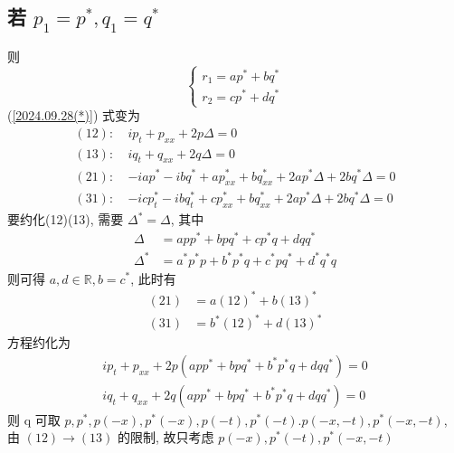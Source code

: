 \subsection{若 $ p_{1} = p^{*}, q_{1} = q^{*}$}
则
\begin{equation}
    \begin{cases}\label{2024.09.28r}
        r_1 = ap^{*} + bq^{*} \\
        r_2 = cp^{*} + dq^{*}
    \end{cases}
\end{equation}
(\ref{2024.09.28(*)}) 式变为 
\begin{equation}
    \begin{aligned}
        (12): \ & ip_{t} + p_{xx} + 2p \Delta = 0 \\
        (13): \ & iq_{t} + q_{xx} + 2q \Delta = 0 \\
        (21): \ & -iap^{*} - ibq^{*} + ap^{*}_{xx} + bq^{*}_{xx} + 2ap^{*}\Delta + 2bq^{*}\Delta = 0 \\
        (31): \ & -icp^{*}_{t} - ibq^{*}_{t} + cp^{*}_{xx} + bq^{*}_{xx} + 2ap^{*}\Delta + 2bq^{*}\Delta = 0
    \end{aligned}
\end{equation}
要约化(12)(13), 需要 $ \Delta^{*} = \Delta $, 其中 
\begin{equation}
    \begin{aligned}
        \Delta &= app^{*} + bpq^{*} + cp^{*}q + dqq^{*} \\
        \Delta^{*} &= a^{*}p^{*}p + b^{*}p^{*}q + c^{*}pq^{*} + d^{*}q^{*}q
    \end{aligned}
\end{equation} 
则可得 $ a, d \in \mathbb{R}, b = c^{*} $, 此时有
\begin{equation*}
    \begin{aligned}
        (21) &= a(12)^{*} + b(13)^{*} \\
        (31) &= b^{*}(12)^{*} + d(13)^{*}
    \end{aligned}
\end{equation*}
方程约化为
\begin{equation*}
    \begin{aligned}
        ip_{t} + p_{xx} + 2p(app^{*} + bpq^{*} + b^{*}p^{*}q + dqq^{*}) = 0\\
        iq_{t} + q_{xx} + 2q(app^{*} + bpq^{*} + b^{*}p^{*}q + dqq^{*}) = 0
    \end{aligned}
\end{equation*}
则 q 可取 $ p, p^{*}, p(-x), p^{*}(-x), p(-t), p^{*}(-t). p(-x,-t), p^{*}(-x,-t) $, 由 $(12) \to (13)$ 的限制, 故只考虑 $ p(-x), p^{*}(-t), p^{*}(-x,-t) $

